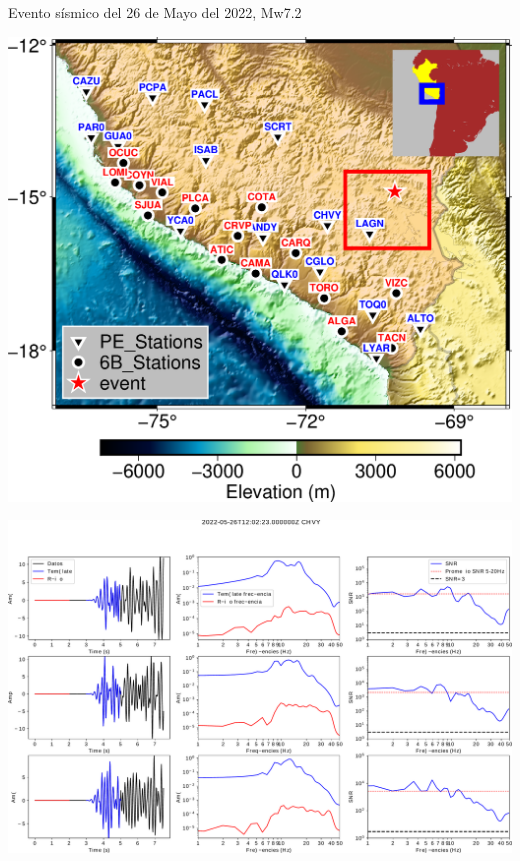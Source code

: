\documentclass{beamer}
\begin{document}
\begin{frame}
 {Evento sísmico del 26 de Mayo del 2022, Mw7.2}
 
 \begin{minipage}{0.9\linewidth}
  \centering \includegraphics[width=0.9\linewidth]{images/map_peru}
 \end{minipage}
  
\end{frame}



\begin{frame}
 
 \begin{minipage}{1\linewidth}
  \includegraphics[width=1\linewidth]{images/snr_event_0_CHVY}
 \end{minipage}
 
\end{frame}
\end{document}
